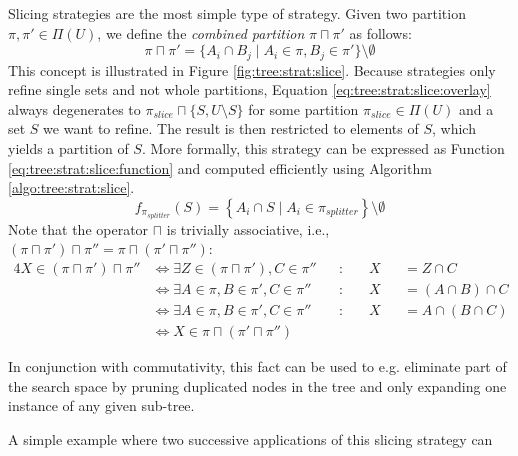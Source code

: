 			Slicing strategies are the most simple type of strategy.
			Given two partition $\pi, \pi' \in \Pi(U)$, we define the \textit{combined partition} $\pi \sqcap \pi'$ as follows:
			\begin{equation}
				\label{eq:tree:strat:slice:overlay}
				\pi \sqcap \pi' = \{ A_i \cap B_j \mid A_i \in \pi, B_j \in \pi' \} \setminus \emptyset
			\end{equation}
			This concept is illustrated in Figure \ref{fig:tree:strat:slice}.
			Because strategies only refine single sets and not whole partitions, Equation \ref{eq:tree:strat:slice:overlay} always degenerates to $\pi_{slice} \sqcap \{ S, U \setminus S \}$ for some partition $\pi_{slice} \in \Pi(U)$ and a set $S$ we want to refine.
			The result is then restricted to elements of $S$, which yields a partition of $S$.
			More formally, this strategy can be expressed as Function \ref{eq:tree:strat:slice:function} and computed efficiently using Algorithm \ref{algo:tree:strat:slice}.
			\begin{equation}
			\label{eq:tree:strat:slice:function}
				f_{\pi_{splitter}}(S) = \left\{ A_i \cap S \mid A_i \in \pi_{splitter} \right\} \setminus \emptyset
			\end{equation}
			Note that the operator $\sqcap$ is trivially associative, i.e., $(\pi \sqcap \pi') \sqcap \pi'' = \pi \sqcap (\pi' \sqcap \pi'')$:
			\begin{alignat*}{4}
				X \in (\pi \sqcap \pi') \sqcap \pi'' &\iff \exists Z \in (\pi \sqcap \pi'), C \in \pi'' && : \; && X && ={} Z \cap C \\
				&\iff \exists A \in \pi, B \in \pi', C \in \pi''&& : \; && X && ={} (A \cap B) \cap C \\
				&\iff \exists A \in \pi, B \in \pi', C \in \pi''&& : \; && X && ={} A \cap (B \cap C) \\
				&\iff  X \in \pi \sqcap (\pi' \sqcap \pi'')
			\end{alignat*}

			In conjunction with commutativity, this fact can be used to e.g. eliminate part of the search space by pruning duplicated nodes in the tree and only expanding one instance of any given sub-tree.

			A simple example where two successive applications of this slicing strategy can

